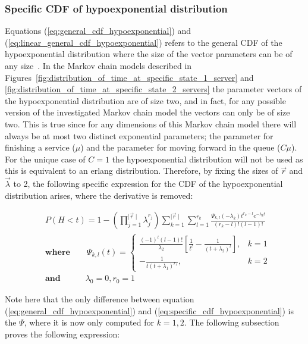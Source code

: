\subsubsection{Specific CDF of hypoexponential distribution}
Equations (\ref{eq:general_cdf_hypoexponential}) and
(\ref{eq:linear_general_cdf_hypoexponential}) refers to the general CDF of the
hypoexponential distribution where the size of the vector parameters can be of
any size~\cite{Favaro2010}.
In the Markov chain models described in
Figures~\ref{fig:distribution_of_time_at_specific_state_1_server} and
\ref{fig:distribution_of_time_at_specific_state_2_servers} the parameter vectors
of the hypoexponential distribution are of size two, and in fact, for any
possible version of the investigated Markov chain model the vectors can only be
of size two.
This is true since for any dimensions of this Markov chain model there will
always be at most two distinct exponential parameters; the parameter for
finishing a service (\(\mu\)) and the parameter for moving forward in the queue
(\(C \mu\)).
For the unique case of \(C=1\) the hypoexponential distribution will not be
used as this is equivalent to an erlang distribution.
Therefore, by fixing the sizes of \(\vec{r}\) and \(\vec{\lambda}\) to 2, the
following specific expression for the CDF of the hypoexponential distribution
arises, where the derivative is removed:


\begin{align} \label{eq:specific_cdf_hypoexponential}
    & P(H < t) = 1 - \left( \prod_{j=1}^{\mid \vec{r} \mid} \lambda_j^{r_j}
    \right) \sum_{k=1}^{\mid \vec{r} \mid} \sum_{l=1}^{r_k}
    \frac{\Psi_{k,l}(-\lambda_k)t^{r_k - l} e^{-\lambda_k t}}{(r_k - l)!
    (l - 1)!} \nonumber \\
    & \textbf{where} \qquad \Psi_{k,l}(t) =
    \begin{cases}
        \frac{(-1)^{l} (l-1)!}{\lambda_2} \left[\frac{1}{t^l} - \frac{1}
        {(t + \lambda_2)^l}\right] , & k=1 \\
        - \frac{1}{t (t + \lambda_1)^{r_1}}, & k=2
    \end{cases} \nonumber \\
    & \textbf{and} \quad \qquad \lambda_0 = 0, r_0 = 1
\end{align}

Note here that the only difference between equation
(\ref{eq:general_cdf_hypoexponential}) and
(\ref{eq:specific_cdf_hypoexponential}) is the \(\Psi\), where it is now only
computed for \(k=1,2\).
The following subsection proves the following expression:


